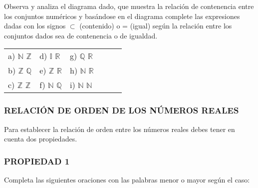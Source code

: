 \documentclass[12pt,a4paper]{article}
\begin{document}
Observa y analiza el diagrama dado, que muestra la relación de contenencia entre los conjuntos numéricos y basándose en el diagrama complete las expresiones dadas con los signos $\subset$ (contenido) o = (igual) según la relación entre los conjuntos dados sea de contenencia o de igualdad.

\vspace{0.5cm}

\begin{center}
\begin{tabular}{llllll}
a) $\mathbb{N}$ \underline{\hspace{1cm}} $\mathbb{Z}$ &
d) $\mathbb{I}$ \underline{\hspace{1cm}} $\mathbb{R}$ &
g) $\mathbb{Q}$ \underline{\hspace{1cm}} $\mathbb{R}$ \\[0.3cm]
b) $\mathbb{Z}$ \underline{\hspace{1cm}} $\mathbb{Q}$ &
e) $\mathbb{Z}$ \underline{\hspace{1cm}} $\mathbb{R}$ &
h) $\mathbb{N}$ \underline{\hspace{1cm}} $\mathbb{R}$ \\[0.3cm]
c) $\mathbb{Z}$ \underline{\hspace{1cm}} $\mathbb{Z}$ &
f) $\mathbb{N}$ \underline{\hspace{1cm}} $\mathbb{Q}$ &
i) $\mathbb{N}$ \underline{\hspace{1cm}} $\mathbb{N}$ \\
\end{tabular}
\end{center}

\vspace{1cm}

\subsubsection*{RELACIÓN DE ORDEN DE LOS NÚMEROS REALES}

Para establecer la relación de orden entre los números reales debes tener en cuenta dos propiedades.

\subsubsection*{PROPIEDAD 1}

Completa las siguientes oraciones con las palabras menor o mayor según el caso:
\end{document}
